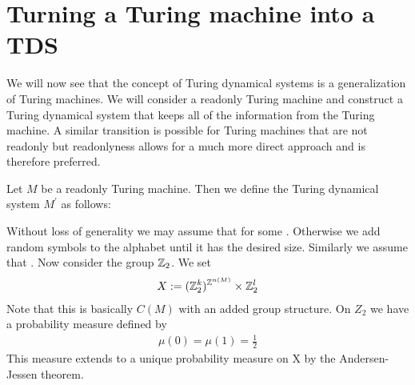 \section{Turning a Turing machine into a TDS} \label{tm_to_tds}

We will now see that the concept of Turing dynamical systems is a generalization of Turing machines.
We will consider a readonly Turing machine and construct a Turing dynamical system that keeps all of the information from the Turing machine.
A similar transition is possible for Turing machines that are not readonly but readonlyness allows for a much more direct approach and is therefore preferred.

Let $M$ be a readonly Turing machine.
Then we define the Turing dynamical system $M^\prime$ as follows:

Without loss of generality we may assume that  for some .
Otherwise we add random symbols to the alphabet until it has the desired size.
Similarly we assume that .
Now consider the group $\mathbb{Z}_2$.
We set
\begin{align*}
	X := {(\mathbb{Z}_2^{k})^{\mathbb{Z}^{n(M)}}} \times \mathbb{Z}_2^l
\end{align*}
Note that this is basically $C(M)$ with an added group structure. On $Z_2$ we have a probability measure defined by
\begin{align*}
	\mu(0) = \mu(1) = \frac12
\end{align*}
This measure extends to a unique probability measure on X by the Andersen-Jessen theorem. %



